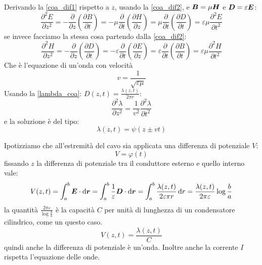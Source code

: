 Derivando la \eqref{coa_dif1} rispetto a $z$, usando la \eqref{coa_dif2}, e $\boldsymbol{B}=\mu\boldsymbol{H}$ e $\boldsymbol{D}=\varepsilon\boldsymbol{E}$:
\begin{equation}
  \frac{\partial^2 E}{\partial z^2}=-\frac{\partial}{\partial z}\left(\frac{\partial B}{\partial t}\right)=-\mu\frac{\partial}{\partial t}\left(\frac{\partial H}{\partial z}\right)=\mu\frac{\partial}{\partial t}\left(\frac{\partial D}{\partial t}\right)=\varepsilon\mu\frac{\partial^2 E}{\partial t^2}
\end{equation}
se invece facciamo la stessa cosa partendo dalla \eqref{coa_dif2}:
\begin{equation}
  \frac{\partial^2 H}{\partial z^2}=-\frac{\partial}{\partial z}\left(\frac{\partial D}{\partial t}\right)=-\varepsilon\frac{\partial}{\partial t}\left(\frac{\partial E}{\partial z}\right)=\varepsilon\frac{\partial}{\partial t}\left(\frac{\partial B}{\partial t}\right)=\varepsilon\mu\frac{\partial^2 H}{\partial t^2}
\end{equation}
Che è l'equazione di un'onda con velocità
\begin{equation}
  v=\frac{1}{\sqrt{\varepsilon\mu}}
\end{equation}
Usando la \eqref{lambda_coa}: $D(z,t)=\frac{\lambda(z,t)}{2\pi r}$:
\begin{equation}
  \frac{\partial^2\lambda}{\partial z^2}=\frac{1}{v^2}\frac{\partial^2 \lambda}{\partial t^2}
\end{equation}
e la soluzione è del tipo:
\begin{equation}
  \lambda(z,t)=\psi(z\pm vt)
\end{equation}

Ipotizziamo che all'estremità del cavo sia applicata una differenza di potenziale $V$:
\begin{equation}
  V = \varphi(t)
\end{equation}
fissando $z$ la differenza di potenziale tra il conduttore esterno e quello interno vale:
\begin{equation}
  V(z,t)=\int_a^b\boldsymbol{E}\cdot\mathrm{d}\boldsymbol{r}=\int_a^b\frac{1}{\varepsilon}\boldsymbol{D}\cdot\mathrm{d}\boldsymbol{r}=\int_a^b\frac{\lambda(z,t)}{2\varepsilon\pi r}\,\mathrm{d} r=\frac{\lambda(z,t)}{2\pi\varepsilon}\log\frac{b}{a}
\end{equation}
la quantità $\frac{2\pi\varepsilon}{\log\frac{b}{a}}$ è la capacità $C$ per unità di lunghezza di un condensatore cilindrico, come un questo caso.
\begin{equation}
  V(z,t)=\frac{\lambda(z,t)}{C}
\end{equation}
quindi anche la differenza di potenziale è un'onda. Inoltre anche la corrente $I$ rispetta l'equazione delle onde.
